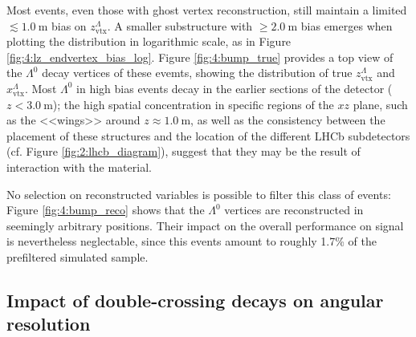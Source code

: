 Most \demonstratorshort events, even those with ghost vertex reconstruction, still maintain a limited $\lesssim \SI{1.0}{\meter}$ bias on $z_\text{vtx}^\Lambda$.
A smaller substructure with $\geq \SI{2.0}{\meter}$ bias emerges when plotting the distribution in logarithmic scale, as in Figure \ref{fig:4:lz_endvertex_bias_log}.
Figure \ref{fig:4:bump_true} provides a top view of the $\Lambda^0$ decay vertices of these evemts, showing the distribution of true $z_\text{vtx}^\Lambda$ and $x_\text{vtx}^\Lambda$.
Most $\Lambda^0$ in high bias events decay in the earlier sections of the detector ($z<\SI{3.0}{\meter}$);
the high spatial concentration in specific regions of the $xz$ plane, such as the <<wings>> around $z\approx \SI{1.0}{\meter}$, as well as the consistency between the placement of these structures and the location of the different LHCb subdetectors (cf. Figure \ref{fig:2:lhcb_diagram}), suggest that they may be the result of interaction with the material.

No selection on reconstructed variables is possible to filter this class of events:
Figure \ref{fig:4:bump_reco} shows that the $\Lambda^0$ vertices are reconstructed in seemingly arbitrary positions.
Their impact on the overall performance on signal is nevertheless neglectable, since this events amount to roughly 1.7\% of the prefiltered simulated sample.

\subsection{Impact of double-crossing decays on angular resolution}